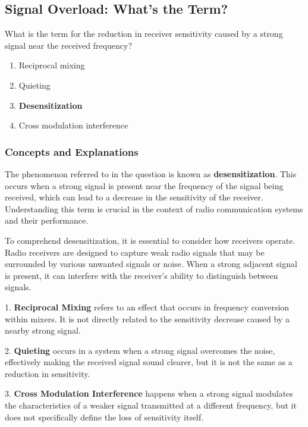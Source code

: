 \subsection{Signal Overload: What’s the Term?}

\begin{tcolorbox}[colback=gray!10, colframe=black, title=E4D06`]
What is the term for the reduction in receiver sensitivity caused by a strong signal near the received frequency?

\begin{enumerate}[label=\Alph*.]
    \item Reciprocal mixing
    \item Quieting
    \item \textbf{Desensitization}
    \item Cross modulation interference
\end{enumerate} \end{tcolorbox}

\subsubsection*{Concepts and Explanations}

The phenomenon referred to in the question is known as \textbf{desensitization}. This occurs when a strong signal is present near the frequency of the signal being received, which can lead to a decrease in the sensitivity of the receiver. Understanding this term is crucial in the context of radio communication systems and their performance.

To comprehend desensitization, it is essential to consider how receivers operate. Radio receivers are designed to capture weak radio signals that may be surrounded by various unwanted signals or noise. When a strong adjacent signal is present, it can interfere with the receiver’s ability to distinguish between signals.

1. \textbf{Reciprocal Mixing} refers to an effect that occurs in frequency conversion within mixers. It is not directly related to the sensitivity decrease caused by a nearby strong signal.
   
2. \textbf{Quieting} occurs in a system when a strong signal overcomes the noise, effectively making the received signal sound clearer, but it is not the same as a reduction in sensitivity.

3. \textbf{Cross Modulation Interference} happens when a strong signal modulates the characteristics of a weaker signal transmitted at a different frequency, but it does not specifically define the loss of sensitivity itself.

